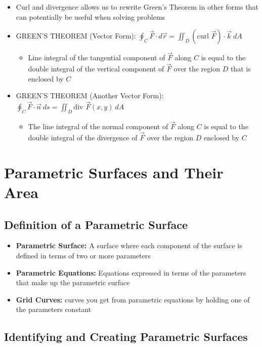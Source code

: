 \documentclass{package/notes}
\begin{document}
\begin{itemize}
	\item Curl and divergence allows us to rewrite Green's Theorem in other forms that can potentially be useful when solving problems
	\item GREEN'S THEOREM (Vector Form): $\oint_C \vec F \cdot d\vec r = \iint_D (\text{curl }\vec F)\cdot \vec k \:dA$
	\begin{itemize}
		\item Line integral of the tangential component of $\vec F$ along $C$ is equal to the double integral of the vertical component of $\vec F$ over the region $D$ that is enclosed by $C$
	\end{itemize}
	\item GREEN'S THEOREM (Another Vector Form): $\oint_C \vec F \cdot \vec n \:ds = \iint_D \text{div }\vec F(x,y)\:dA$
	\begin{itemize}
		\item The line integral of the normal component of $\vec F$ along $C$ is equal to the double integral of the divergence of $\vec F$ over the region $D$ enclosed by $C$
	\end{itemize}
\end{itemize}



\section{Parametric Surfaces and Their Area}


\subsection{Definition of a Parametric Surface}

\begin{itemize}
	\item \textbf{Parametric Surface:} A surface where each component of the surface is defined in terms of two or more parameters
	\item \textbf{Parametric Equations:} Equations expressed in terms of the parameters that make up the parametric surface
	\item \textbf{Grid Curves:} curves you get from parametric equations by holding one of the parameters constant
\end{itemize}


\subsection{Identifying and Creating Parametric Surfaces}
\end{document}
